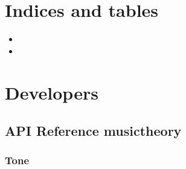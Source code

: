 \documentclass[letterpaper,10pt,english]{sphinxmanual}
\begin{document}
\chapter{Indices and tables}
\label{\detokenize{index:indices-and-tables}}\begin{itemize}
\item {} 

\item {} 

\end{itemize}


\chapter{Developers}
\label{\detokenize{index:developers}}

\section{API Reference \sphinxhyphen{} musictheory}
\label{\detokenize{api:module-musictheory}}\label{\detokenize{api:api-reference-musictheory}}\label{\detokenize{api::doc}}

\subsection{Tone}
\label{\detokenize{api:tone}}
\end{document}
